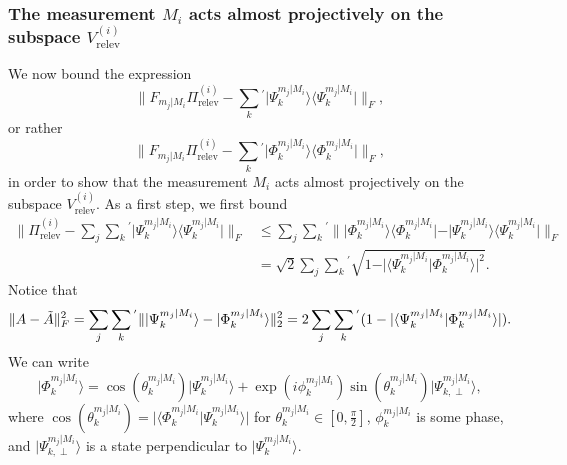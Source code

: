 \subsubsection{The measurement $M_i$ acts almost projectively on the subspace $V_{\text{relev}}^{(i)}$}
We now bound the expression
\begin{equation}
\|F_{m_j\vert M_i}\Pi_{\text{relev}}^{(i)}-\sum_{k}{}^{'}\vert \Psi_k^{m_j\vert M_i}\rangle \langle \Psi_k^{m_j\vert M_i}\vert \|_F,
\end{equation}
or rather
\begin{equation}
\|F_{m_j\vert M_i}\Pi_{\text{relev}}^{(i)}-\sum_{k}{}^{'}\vert \Phi_k^{m_j\vert M_i}\rangle \langle \Phi_k^{m_j\vert M_i}\vert \|_F,
\end{equation}
in order to show that the measurement $M_i$ acts almost projectively on the subspace $V_{\text{relev}}^{(i)}$. As a first step, we first bound
\begin{equation}
\begin{split}
\|\Pi_{\text{relev}}^{(i)}-\sum_j\sum_k{}^{'}\vert \Psi_k^{m_j\vert M_i}\rangle \langle \Psi_k^{m_j\vert M_i}\vert \|_F & \leq \sum_j\sum_k{}^{'}\| \vert \Phi_k^{m_j\vert M_i}\rangle \langle \Phi_k^{m_j\vert M_i}\vert-\vert \Psi_k^{m_j\vert M_i}\rangle \langle \Psi_k^{m_j\vert M_i}\vert\|_F \\
& =\sqrt{2}\sum_j\sum_k{}^{'}\sqrt{1-\vert \langle \Psi_k^{m_j\vert M_i} \vert \Phi_k^{m_j\vert M_i} \rangle \vert^2}.
\end{split}
\end{equation}
Notice that
\begin{equation}
\|A-\Tilde{A}\|_F^2=\sum_j\sum_k{}^{'}\|\vert \Psi_k^{m_j\vert M_i} \rangle - \vert \Phi_k^{m_j\vert M_i}\rangle\|_2^2=2\sum_j\sum_k{}^{'}(1-\vert\langle \Psi_k^{m_j\vert M_i} \vert \Phi_k^{m_j\vert M_i} \rangle \vert).
\end{equation}
We can write 
\begin{equation}
\vert \Phi_k^{m_j\vert M_i}\rangle = \cos(\theta_k^{m_j\vert M_i})\vert \Psi_k^{m_j\vert M_i}\rangle + \exp(i\phi_k^{m_j\vert M_i})\sin(\theta_k^{m_j\vert M_i})\vert \Psi_{k,\perp}^{m_j\vert M_i} \rangle, 
\end{equation}
where $\cos(\theta_k^{m_j\vert M_i})= \vert\langle \Phi_k^{m_j\vert M_i}\vert\Psi_k^{m_j\vert M_i} \rangle\vert$ for $\theta_k^{m_j\vert M_i}\in[0,\frac{\pi}{2}]$, $\phi_k^{m_j\vert M_i}$ is some phase, and $\vert \Psi_{k,\perp}^{m_j\vert M_i} \rangle$ is a state perpendicular to $\vert \Psi_k^{m_j\vert M_i}\rangle$.
